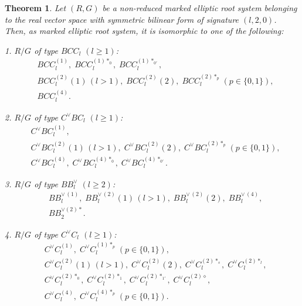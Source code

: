 \documentclass[11pt]{amsart}
\newtheorem{thm}{Theorem}[section]
\begin{document}
\begin{thm}\label{thm_classification-non-reduced}
Let $(R,G)$ be a non-reduced marked elliptic root system belonging to the real vector space
with symmetric bilinear form of signature $(l,2,0)$.  Then, 
as marked elliptic root system, it is isomorphic to one of the following:

\item 1. $R/G$ of type $BCC_l$ $(l\geq 1)$:
\begin{align*}
& BCC_l^{(1)}, \; BCC_l^{(1)\ast_0},\; BCC_l^{(1)\ast_{0'}}, \\
& BCC_l^{(2)}(1)\,  (l>1), \; BCC_l^{(2)}(2), \; BCC_l^{(2)\ast_p} \, (p \in \{0,1\}), \\
& BCC_l^{(4)}.
\end{align*}
\item 2. $R/G$ of type $C^\vee BC_l$ $(l\geq 1)$:
\begin{align*}
& C^\vee BC_l^{(1)}, \\
& C^\vee BC_l^{(2)}(1)\,  (l>1), \; C^\vee BC_l^{(2)}(2), \; C^\vee BC_l^{(2)\ast_p} \, (p \in \{0,1\}), 
\\
& C^\vee BC_l^{(4)}, \; C^\vee BC_l^{(4)\ast_0},\; C^\vee BC_l^{(4)\ast_{0'}}.
\end{align*}
\item 3. $R/G$ of type $BB_l^\vee$ $(l\geq 2)$:
\begin{align*}
& BB_l^{\vee \, (1)}, \; BB_l^{\vee \, (2)}(1)\,  (l>1), \;  BB_l^{\vee \, (2)}(2), \; BB_l^{\vee \, (4)}, \\
& BB_2^{\vee (2) \ast}.
\end{align*}
\item 4. $R/G$ of type $C^\vee C_l$ $(l\geq 1)$:
\begin{align*}
&C^\vee C_l^{(1)}, \; C^\vee C_l^{(1)\ast_p} \, (p \in \{0,1\}), \\
&C^\vee C_l^{(2)}(1)\,  (l>1), \; C^\vee C_l^{(2)}(2), \; C^\vee C_l^{(2)\ast_s}, \; C^\vee C_l^{(2)\ast_l}, \\
&C^\vee C_l^{(2)\ast_{0}}, \; C^\vee C_l^{(2)\ast_1}, \; 
C^\vee C_l^{(2)\ast_{1'}}, \; C^\vee C_l^{(2)\diamond}, \\
&C^\vee C_l^{(4)}, \; C^\vee C_l^{(4)\ast_p} \, (p \in \{0,1\}).
\end{align*}
\end{thm}
\end{document}
